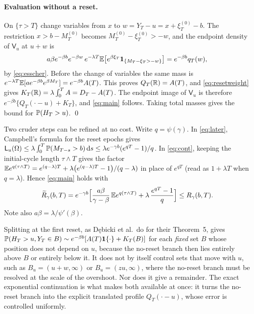\documentclass[11pt,a4paper]{article}
\begin{document}
\paragraph{Evaluation without a reset.}
On $\{\tau>T\}$ change variables from $x$ to $w=Y_T-u=x+\xi^{(0)}_T-b$. The restriction $x>b-M^{(0)}_T$ becomes $M^{(0)}_T-\xi^{(0)}_T>-w$, and the endpoint density of $\mathsf V_u$ at $u+w$ is
\[
 a\beta e^{-\beta b}e^{-\beta w}\,e^{-\lambda T}\mathbb E\big[e^{\beta\xi_T}\mathbf 1_{\{M_T-\xi_T>-w\}}\big]=e^{-\beta b}q_T(w),
\]
by \eqref{eq:esscher}. Before the change of variables the same mass is $e^{-\lambda T}\mathbb E[a e^{-\beta b}e^{\beta M_T}]=e^{-\beta b}A(T)$. This proves $Q_T(\mathbb R)=A(T)$, and \eqref{eq:resetweight} gives $K_T(\mathbb R)=\lambda\int_0^TA=D_T-A(T)$. The endpoint image of $\mathsf V_u$ is therefore $e^{-\beta b}\{Q_T(\cdot-u)+K_T\}$, and \eqref{eq:main} follows. Taking total masses gives the bound for $\mathbb P(H_T>u)$. \qed

\begin{remark}\label{rem:sharp}
Two cruder steps can be refined at no cost. Write $q=\psi(\gamma)$. In \eqref{eq:later}, Campbell's formula for the reset epochs gives $\mathsf L_u(\Omega)\le\lambda\int_0^T\mathbb P(M_{T-s}>b)\,\mathrm d s\le\lambda e^{-\gamma b}(e^{qT}-1)/q$. In \eqref{eq:cont}, keeping the initial-cycle length $\tau\wedge T$ gives the factor $\mathbb E e^{q(\tau\wedge T)}=e^{(q-\lambda)T}+\lambda\big(e^{(q-\lambda)T}-1\big)/(q-\lambda)$ in place of $e^{qT}$ (read as $1+\lambda T$ when $q=\lambda$). Hence \eqref{eq:main} holds with
\[
 \widetilde R_\gamma(b,T)=e^{-\gamma b}\Big[\frac{a\beta}{\gamma-\beta}\,\mathbb E e^{q(\tau\wedge T)}+\lambda\,\frac{e^{qT}-1}{q}\Big]\le R_\gamma(b,T).
\]
Note also $a\beta=\lambda/\psi'(\beta)$.
\end{remark}

\begin{remark}\label{rem:naive}
Splitting at the first reset, as D\k{e}bicki et al.\ do for their Theorem~5, gives $\mathbb P(H_T>u,Y_T\in B)\sim e^{-\beta b}[A(T)\mathbf 1\{\cdot\}+K_T(B)]$ for each \emph{fixed} set $B$ whose position does not depend on $u$, because the no-reset branch then lies entirely above $B$ or entirely below it. It does not by itself control sets that move with $u$, such as $B_u=(u+w,\infty)$ or $B_u=(zu,\infty)$, where the no-reset branch must be resolved at the scale of the overshoot. Nor does it give a remainder. The exact exponential continuation is what makes both available at once: it turns the no-reset branch into the explicit translated profile $Q_T(\cdot-u)$, whose error is controlled uniformly.
\end{remark}
\end{document}
